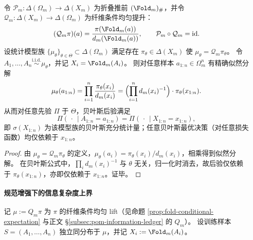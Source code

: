\begin{theorem}[纤维均匀模型的似然分解与贝叶斯后验塌缩]\label{thm:op-algebra-fold-bayes-posterior-collapse}
令 \(\mathcal P_m:\Delta(\Omega_m)\to\Delta(X_m)\) 为折叠推前 \((\Fold_m)_\#\)，并令 \(\mathcal Q_m:\Delta(X_m)\to\Delta(\Omega_m)\) 为纤维条件均匀提升：
\[
(\mathcal Q_m\pi)(a)=\frac{\pi(\Fold_m(a))}{d_m(\Fold_m(a))},
\qquad
\mathcal P_m\circ \mathcal Q_m=\mathrm{id}.
\]
设统计模型族 \(\{\mu_\theta\}_{\theta\in\Theta}\subset\Delta(\Omega_m)\) 满足存在 \(\pi_\theta\in\Delta(X_m)\) 使
\(
\mu_\theta=\mathcal Q_m\pi_\theta
\)。
令 \(A_1,\dots,A_n\stackrel{\mathrm{i.i.d.}}{\sim}\mu_\theta\)，并记 \(X_i=\Fold_m(A_i)\)。
则对任意样本 \(a_{1:n}\in\Omega_m^n\) 有精确似然分解
\[
\mu_\theta(a_{1:n})
=\prod_{i=1}^n \frac{\pi_\theta(x_i)}{d_m(x_i)}
=\Bigl(\prod_{i=1}^n d_m(x_i)^{-1}\Bigr)\cdot \pi_\theta(x_{1:n}).
\]
从而对任意先验 \(\Pi\) 于 \(\Theta\)，贝叶斯后验满足
\[
\Pi(\,\cdot\,\mid A_{1:n}=a_{1:n})=\Pi(\,\cdot\,\mid X_{1:n}=x_{1:n}),
\]
即 \(\sigma(X_{1:n})\) 为该模型族的贝叶斯充分统计量；任意贝叶斯最优决策（对任意损失函数）均仅依赖于 \(x_{1:n}\)。
\end{theorem}

\begin{proof}
由 \(\mu_\theta=\mathcal Q_m\pi_\theta\) 的定义，\(\mu_\theta(a_i)=\pi_\theta(x_i)/d_m(x_i)\)，相乘得到似然分解。
在贝叶斯公式中，\(\prod_i d_m(x_i)^{-1}\) 与 \(\theta\) 无关，归一化时消去，故后验仅依赖于 \(\pi_\theta(x_{1:n})\)，亦即仅依赖于 \(x_{1:n}\)。证毕。
\end{proof}

\paragraph{规范增强下的信息复杂度上界}
记 \(\mu:=Q_m\pi\) 为 \(\pi\) 的纤维条件均匀 lift（见命题 \ref{prop:fold-conditional-expectation} 与正文 \S\ref{subsec:pom-information-ledger} 的 \(Q_m\)）。
设训练样本 \(S=(A_1,\dots,A_n)\) 独立同分布于 \(\mu\)，并记 \(X_i:=\Fold_m(A_i)\)。

